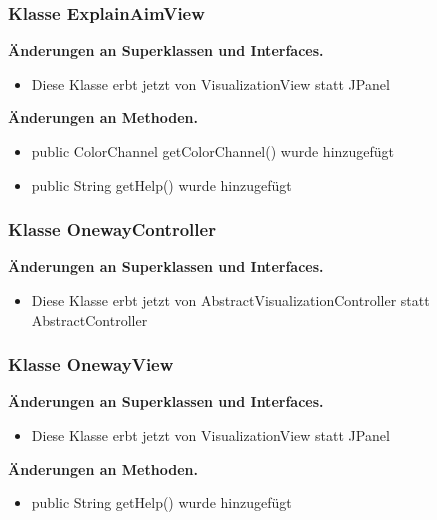 \documentclass{article}
\begin{document}
	\subsubsection{Klasse ExplainAimView}
	    \textbf{Änderungen an Superklassen und Interfaces.}\newline
	   \begin{itemize}
            \item Diese Klasse erbt jetzt von VisualizationView statt JPanel\newline
           \end{itemize}
    \textbf{Änderungen an Methoden.}\newline
	   \begin{itemize}
           \item public ColorChannel getColorChannel() wurde hinzugefügt\newline
           \item public String getHelp() wurde hinzugefügt\newline
           \end{itemize}

	\subsubsection{Klasse OnewayController}
	    \textbf{Änderungen an Superklassen und Interfaces.}\newline
	   \begin{itemize}
            \item Diese Klasse erbt jetzt von AbstractVisualizationController statt AbstractController\newline
           \end{itemize}

	\subsubsection{Klasse OnewayView}
	    \textbf{Änderungen an Superklassen und Interfaces.}\newline
	   \begin{itemize}
            \item Diese Klasse erbt jetzt von VisualizationView statt JPanel\newline
           \end{itemize}
    \textbf{Änderungen an Methoden.}\newline
	   \begin{itemize}
           \item public String getHelp() wurde hinzugefügt\newline
           \end{itemize}
\end{document}
